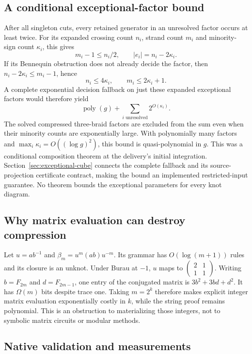 \subsection{A conditional exceptional-factor bound}

After all singleton cuts, every retained generator in an unresolved factor
occurs at least twice. For its expanded crossing count $n_i$, strand count
$m_i$ and minority-sign count $\kappa_i$, this gives
\[
 m_i-1\le n_i/2,\qquad |e_i|=n_i-2\kappa_i.
\]
If its Bennequin obstruction does not already decide the factor, then
$n_i-2\kappa_i\le m_i-1$, hence
\[
 n_i\le4\kappa_i,\qquad m_i\le2\kappa_i+1.
\]
A complete exponential decision fallback on just these expanded exceptional
factors would therefore yield
\[
 \operatorname{poly}(g)+\sum_{i\text{ unresolved}}2^{O(\kappa_i)}.
\]
The solved compressed three-braid factors are excluded from the sum even when
their minority counts are exponentially large. With polynomially many factors
and $\max_i\kappa_i=O((\log g)^2)$, this bound is quasi-polynomial in $g$.
This was a conditional composition theorem at the delivery's initial
integration. Section~\ref{sec:exceptional-cube} connects the complete fallback
and its source-projection certificate contract, making the bound an implemented
restricted-input guarantee. No theorem bounds the exceptional parameters for
every knot diagram.

\subsection{Why matrix evaluation can destroy compression}

Let $u=ab^{-1}$ and $\beta_m=u^m(ab)u^{-m}$. Its grammar has
$O(\log(m+1))$ rules and its closure is an unknot. Under Burau at $-1$,
$u$ maps to $\left(\begin{smallmatrix}2&1\\1&1\end{smallmatrix}\right)$.
Writing $b=F_{2m}$ and $d=F_{2m-1}$, one entry of the conjugated matrix is
$3b^2+3bd+d^2$. It has $\Omega(m)$ bits despite trace one. Taking $m=2^k$
therefore makes explicit integer matrix evaluation exponentially costly in
$k$, while the string proof remains polynomial. This is an obstruction to
materializing those integers, not to symbolic matrix circuits or modular
methods.

\subsection{Native validation and measurements}

